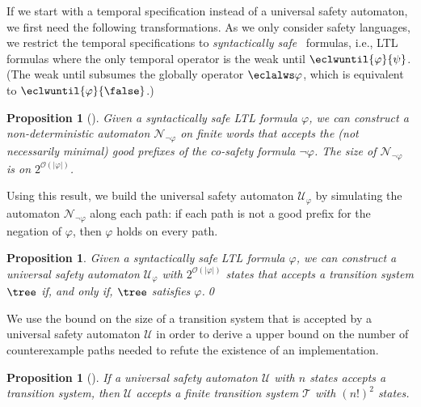 \documentclass{LMCS}
\theoremstyle{plain}\newtheorem{theorem}[thm]{Theorem}
\theoremstyle{plain}\newtheorem{lemma}[thm]{Lemma}
\theoremstyle{plain}\newtheorem{proposition}[thm]{Proposition}
\theoremstyle{plain}\newtheorem{corollary}[thm]{Corollary}
\theoremstyle{definition}\newtheorem{definition}{Definition}[section]
\begin{document}
If we start with a temporal specification instead of a universal safety automaton, we first need the following transformations.
As we only consider safety languages, we restrict the temporal specifications to \emph{syntactically safe}~\cite{DBLP:journals/fac/Sistla94} formulas, i.e., LTL formulas where the only temporal operator is the weak until $\eclwuntil{\varphi}{\psi}$. (The weak until subsumes the globally operator $\eclalws \varphi$, which is equivalent to $\eclwuntil{\varphi}{\false}$.)
\begin{proposition}[\hspace{-0.3pt}\cite{DBLP:journals/fmsd/KupfermanV01}]
  Given a syntactically safe LTL formula $\varphi$, we can construct a non-deterministic automaton $\mathcal{N}_{\neg\varphi}$ on finite words that accepts the (not necessarily minimal) good prefixes of the co-safety formula $\neg\varphi$.
  The size of $\mathcal{N}_{\neg\varphi}$ is on $2^{\mathcal{O}(|\varphi|)}$.
\end{proposition}\noindent
Using this result, we build the universal safety automaton $\mathcal{U}_\varphi$ by simulating the automaton $\mathcal{N}_{\neg\varphi}$ along each path: if each path is not a good prefix for the negation of $\varphi$, then $\varphi$ holds on every path.
\begin{proposition} \label{thm:universal-safety-automaton-for-safety-ltl}
  Given a syntactically safe LTL formula $\varphi$, we can construct a universal safety automaton $\mathcal{U}_\varphi$ with $2^{\mathcal{O}(|\varphi|)}$ states that accepts a transition system $\tree$ if, and only if, $\tree$ satisfies $\varphi$.\qed
\end{proposition}\noindent
We use the bound on the size of a transition system that is accepted by a universal safety automaton $\mathcal{U}$ in order to derive a upper bound on the number of counterexample paths needed to refute the existence of an implementation.
\begin{proposition}[\hspace{-0.3pt}\cite{journals/sttt/FinkbeinerS13}] \label{thm:safety-automaton-finite-transition-system}
If a universal safety automaton $\mathcal{U}$ with $n$ states accepts a transition system, then $\mathcal{U}$ accepts a finite transition system $\mathcal{T}$ with $(n!)^2$ states.
\end{proposition}
\end{document}
